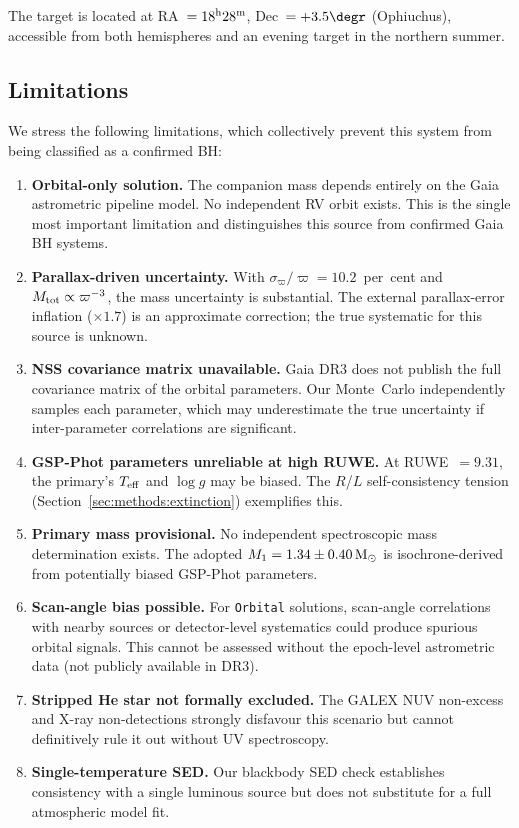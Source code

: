 \documentclass[usenatbib,fleqn]{mnras}
\newcommand{\Msun}{{\rm M}_\odot}
\begin{document}
The target is located at RA~$= 18^{\rm h}28^{\rm m}$,
Dec~$= +3.5\degr$ (Ophiuchus), accessible from both hemispheres
and an evening target in the northern summer.

\subsection{Limitations}
\label{sec:limitations}

We stress the following limitations, which collectively
prevent this system from being classified as a confirmed BH:

\begin{enumerate}
\item \textbf{Orbital-only solution.}  The companion mass
  depends entirely on the Gaia astrometric pipeline model.
  No independent RV orbit exists.  This is the single most
  important limitation and distinguishes this source from
  confirmed Gaia BH systems.

\item \textbf{Parallax-driven uncertainty.}  With
  $\sigma_\varpi / \varpi = 10.2$~per~cent and
  $M_{\rm tot} \propto \varpi^{-3}$, the mass uncertainty is
  substantial.  The external parallax-error inflation ($\times 1.7$)
  is an approximate correction; the true systematic for this
  source is unknown.

\item \textbf{NSS covariance matrix unavailable.}  Gaia DR3 does
  not publish the full covariance matrix of the orbital parameters.
  Our Monte~Carlo independently samples each parameter, which may
  underestimate the true uncertainty if inter-parameter correlations
  are significant.

\item \textbf{GSP-Phot parameters unreliable at high RUWE.}
  At RUWE~$= 9.31$, the primary's $T_{\rm eff}$ and $\log g$
  may be biased.  The $R$/$L$ self-consistency tension
  (Section~\ref{sec:methods:extinction}) exemplifies this.

\item \textbf{Primary mass provisional.}  No independent
  spectroscopic mass determination exists.  The adopted
  $M_1 = 1.34 \pm 0.40\,\Msun$ is isochrone-derived from
  potentially biased GSP-Phot parameters.

\item \textbf{Scan-angle bias possible.}  For \texttt{Orbital}
  solutions, scan-angle correlations with nearby sources or
  detector-level systematics could produce spurious orbital
  signals.  This cannot be assessed without the epoch-level
  astrometric data (not publicly available in DR3).

\item \textbf{Stripped He star not formally excluded.}  The GALEX
  NUV non-excess and X-ray non-detections strongly disfavour
  this scenario but cannot definitively rule it out without UV
  spectroscopy.

\item \textbf{Single-temperature SED.}  Our blackbody SED check
  establishes consistency with a single luminous source but does
  not substitute for a full atmospheric model fit.
\end{enumerate}
\end{document}
